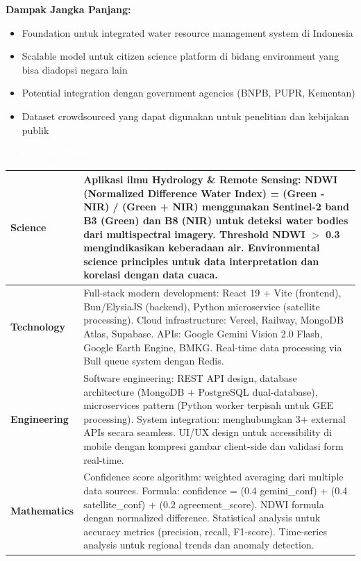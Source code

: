 \documentclass[12pt,a4paper]{article}
\newcommand{\sectionbox}[1]{%
  \colorbox{samsungblue}{%
    \parbox{\textwidth}{%
      \textcolor{white}{\large\bfseries #1}%
    }%
  }%
}
\newcommand{\subsectionbox}[1]{%
  \textbf{\large #1}\\[0.3cm]
}
\begin{document}
\subsectionbox{Dampak Jangka Panjang:}

\begin{itemize}
  \item Foundation untuk integrated water resource management system di Indonesia
  \item Scalable model untuk citizen science platform di bidang environment yang bisa diadopsi negara lain
  \item Potential integration dengan government agencies (BNPB, PUPR, Kementan)
  \item Dataset crowdsourced yang dapat digunakan untuk penelitian dan kebijakan publik
\end{itemize}

\vspace{1cm}

\sectionbox{9. ASPEK STEM}

\vspace{0.5cm}

\begin{tabularx}{\textwidth}{|l|X|}
  \hline
  \textbf{Science} &
    Aplikasi ilmu Hydrology \& Remote Sensing: NDWI (Normalized Difference Water Index) = (Green - NIR) / (Green + NIR) menggunakan Sentinel-2 band B3 (Green) dan B8 (NIR) untuk deteksi water bodies dari multispectral imagery. Threshold NDWI $>$ 0.3 mengindikasikan keberadaan air. Environmental science principles untuk data interpretation dan korelasi dengan data cuaca. \\[0.3cm]
  \hline
  \textbf{Technology} &
    Full-stack modern development: React 19 + Vite (frontend), Bun/ElysiaJS (backend), Python microservice (satellite processing). Cloud infrastructure: Vercel, Railway, MongoDB Atlas, Supabase. APIs: Google Gemini Vision 2.0 Flash, Google Earth Engine, BMKG. Real-time data processing via Bull queue system dengan Redis. \\[0.3cm]
  \hline
  \textbf{Engineering} &
    Software engineering: REST API design, database architecture (MongoDB + PostgreSQL dual-database), microservices pattern (Python worker terpisah untuk GEE processing). System integration: menghubungkan 3+ external APIs secara seamless. UI/UX design untuk accessibility di mobile dengan kompresi gambar client-side dan validasi form real-time. \\[0.3cm]
  \hline
  \textbf{Mathematics} &
    Confidence score algorithm: weighted averaging dari multiple data sources. Formula: confidence = (0.4 \texttimes{} gemini\_conf) + (0.4 \texttimes{} satellite\_conf) + (0.2 \texttimes{} agreement\_score). NDWI formula dengan normalized difference. Statistical analysis untuk accuracy metrics (precision, recall, F1-score). Time-series analysis untuk regional trends dan anomaly detection. \\
  \hline
\end{tabularx}
\end{document}
